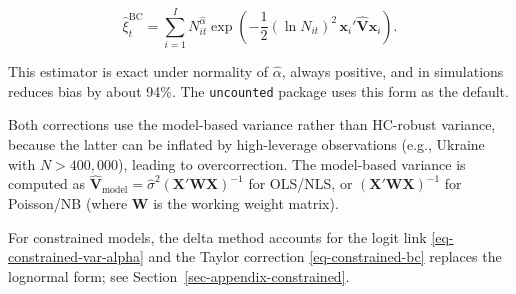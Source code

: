 \[
\hat{\xi}_t^{\text{BC}} = \sum_{i=1}^{I} N_{it}^{\hat{\alpha}} \exp\left(-\frac{1}{2} (\ln N_{it})^2 \, \mathbf{x}_i' \hat{\mathbf{V}} \mathbf{x}_i\right).
\]

This estimator is exact under normality of $\hat{\alpha}$, always
positive, and in simulations reduces bias by about 94\%. The
\texttt{uncounted} package uses this form as the default.

Both corrections use the model-based variance
rather than HC-robust variance, because the latter can be inflated by
high-leverage observations (e.g., Ukraine with $N > 400{,}000$),
leading to overcorrection. The model-based variance is computed as
$\hat{\mathbf{V}}_{\text{model}} = \hat\sigma^2 (\mathbf{X}'\mathbf{W}\mathbf{X})^{-1}$
for OLS/NLS, or $(\mathbf{X}'\mathbf{W}\mathbf{X})^{-1}$ for
Poisson/NB (where $\mathbf{W}$ is the working weight matrix).

For constrained models, the delta method accounts for the logit link
\eqref{eq-constrained-var-alpha} and the Taylor correction
\eqref{eq-constrained-bc} replaces the lognormal form; see
Section~\ref{sec-appendix-constrained}.
